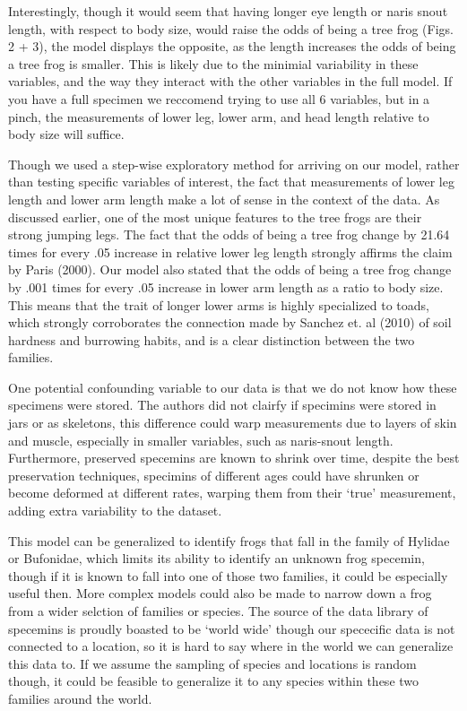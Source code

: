 \documentclass[
]{article}
\begin{document}
Interestingly, though it would seem that having longer eye length or
naris snout length, with respect to body size, would raise the odds of
being a tree frog (Figs. 2 + 3), the model displays the opposite, as the
length increases the odds of being a tree frog is smaller. This is
likely due to the minimial variability in these variables, and the way
they interact with the other variables in the full model. If you have a
full specimen we reccomend trying to use all 6 variables, but in a
pinch, the measurements of lower leg, lower arm, and head length
relative to body size will suffice.

Though we used a step-wise exploratory method for arriving on our model,
rather than testing specific variables of interest, the fact that
measurements of lower leg length and lower arm length make a lot of
sense in the context of the data. As discussed earlier, one of the most
unique features to the tree frogs are their strong jumping legs. The
fact that the odds of being a tree frog change by 21.64 times for every
.05 increase in relative lower leg length strongly affirms the claim by
Paris (2000). Our model also stated that the odds of being a tree frog
change by .001 times for every .05 increase in lower arm length as a
ratio to body size. This means that the trait of longer lower arms is
highly specialized to toads, which strongly corroborates the connection
made by Sanchez et. al (2010) of soil hardness and burrowing habits, and
is a clear distinction between the two families.

One potential confounding variable to our data is that we do not know
how these specimens were stored. The authors did not clairfy if
specimins were stored in jars or as skeletons, this difference could
warp measurements due to layers of skin and muscle, especially in
smaller variables, such as naris-snout length. Furthermore, preserved
specemins are known to shrink over time, despite the best preservation
techniques, specimins of different ages could have shrunken or become
deformed at different rates, warping them from their `true' measurement,
adding extra variability to the dataset.

This model can be generalized to identify frogs that fall in the family
of Hylidae or Bufonidae, which limits its ability to identify an unknown
frog specemin, though if it is known to fall into one of those two
families, it could be especially useful then. More complex models could
also be made to narrow down a frog from a wider selction of families or
species. The source of the data library of specemins is proudly boasted
to be `world wide' though our spececific data is not connected to a
location, so it is hard to say where in the world we can generalize this
data to. If we assume the sampling of species and locations is random
though, it could be feasible to generalize it to any species within
these two families around the world.
\end{document}
